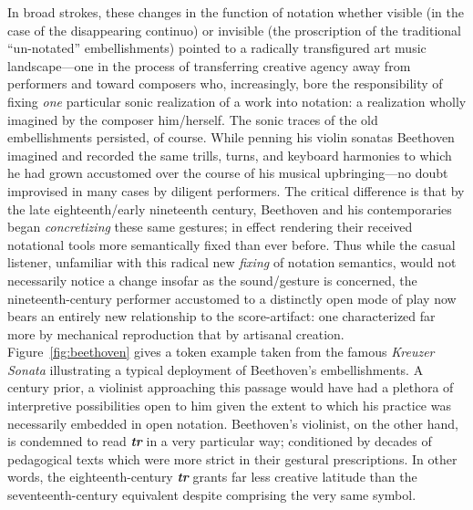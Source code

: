     In broad strokes, these changes in the function of notation whether visible (in the case of the disappearing continuo) or invisible (the proscription of the traditional ``un-notated'' embellishments) pointed to a radically transfigured art music landscape---one in the process of transferring creative agency away from performers and toward composers who, increasingly, bore the responsibility of fixing \textit{one} particular sonic realization of a work into notation: a realization wholly imagined by the composer him/herself. The sonic traces of the old embellishments persisted, of course. While penning his violin sonatas Beethoven imagined and recorded the same trills, turns, and keyboard harmonies to which he had grown accustomed over the course of his musical upbringing---no doubt improvised in many cases by diligent performers. The critical difference is that by the late eighteenth/early nineteenth century, Beethoven and his contemporaries began \textit{concretizing} these same gestures; in effect rendering their received notational tools more semantically fixed than ever before. Thus while the casual listener, unfamiliar with this radical new \textit{fixing} of notation semantics, would not necessarily notice a change insofar as the sound/gesture is concerned, the nineteenth-century performer accustomed to a distinctly open mode of play now bears an entirely new relationship to the score-artifact: one characterized far more by mechanical reproduction that by artisanal creation. Figure~\ref{fig:beethoven} gives a token example taken from the famous \textit{Kreuzer Sonata} illustrating a typical deployment of Beethoven's embellishments. A century prior, a violinist approaching this passage would have had a plethora of interpretive possibilities open to him given the extent to which his practice was necessarily embedded in open notation. Beethoven's violinist, on the other hand, is condemned to read \textbf{\textit{tr}} in a very particular way; conditioned by decades of pedagogical texts which were more strict in their gestural prescriptions. In other words, the eighteenth-century \textbf{\textit{tr}} grants far less creative latitude than the seventeenth-century equivalent despite comprising the very same symbol.
    
    
